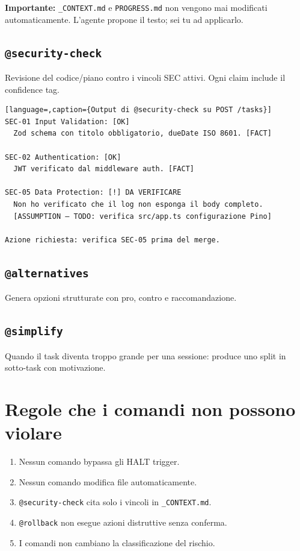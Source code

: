 \textbf{Importante:} \texttt{\_CONTEXT.md} e \texttt{PROGRESS.md} non vengono mai modificati automaticamente. L'agente propone il testo; sei tu ad applicarlo.

\subsection*{\texttt{@security-check}}

Revisione del codice/piano contro i vincoli SEC attivi. Ogni claim include il confidence tag.

\begin{lstlisting}[language=,caption={Output di @security-check su POST /tasks}]
SEC-01 Input Validation: [OK]
  Zod schema con titolo obbligatorio, dueDate ISO 8601. [FACT]

SEC-02 Authentication: [OK]
  JWT verificato dal middleware auth. [FACT]

SEC-05 Data Protection: [!] DA VERIFICARE
  Non ho verificato che il log non esponga il body completo.
  [ASSUMPTION — TODO: verifica src/app.ts configurazione Pino]

Azione richiesta: verifica SEC-05 prima del merge.
\end{lstlisting}

\subsection*{\texttt{@alternatives}}

Genera opzioni strutturate con pro, contro e raccomandazione.

\subsection*{\texttt{@simplify}}

Quando il task diventa troppo grande per una sessione: produce uno split in sotto-task con motivazione.

\section{Regole che i comandi non possono violare}
\label{sec:13-regole}

\begin{enumerate}
  \item Nessun comando bypassa gli HALT trigger.
  \item Nessun comando modifica file automaticamente.
  \item \texttt{@security-check} cita solo i vincoli in \texttt{\_CONTEXT.md}.
  \item \texttt{@rollback} non esegue azioni distruttive senza conferma.
  \item I comandi non cambiano la classificazione del rischio.
\end{enumerate}


